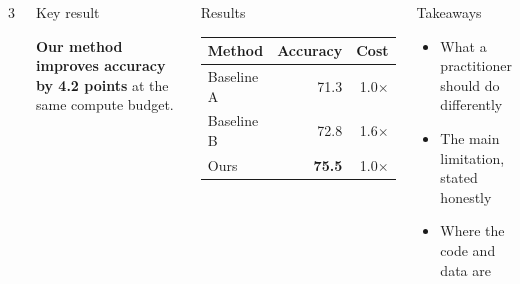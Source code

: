 \documentclass{article}
\begin{document}
\begin{columns}{3}
\begin{block}{Key result}
  \begin{keyresult}
    \textbf{Our method improves accuracy by 4.2 points} at the same compute budget.
  \end{keyresult}
\end{block}

\nextcolumn

\begin{block}{Results}
  \par\vspace{0.6em}
  \begin{tabular}{lrr}
    \textbf{Method} & \textbf{Accuracy} & \textbf{Cost} \\ \hline
    Baseline A      & 71.3              & 1.0$\times$   \\
    Baseline B      & 72.8              & 1.6$\times$   \\
    Ours            & \textbf{75.5}     & 1.0$\times$   \\
  \end{tabular}
\end{block}

\begin{block}{Takeaways}
  \begin{itemize}
    \item What a practitioner should do differently
    \item The main limitation, stated honestly
    \item Where the code and data are
  \end{itemize}
\end{block}
\end{columns}

\makefooter
\end{document}
